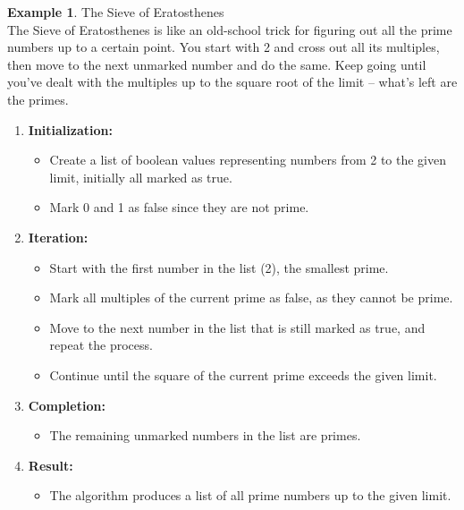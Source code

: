 \documentclass[letterpaper,10pt]{article}
\theoremstyle{plain}
\theoremstyle{definition}
\newtheorem{exmp}[thm]{Example}
\theoremstyle{remark}
\begin{document}
\begin{exmp}{The Sieve of Eratosthenes}$ $\\

The Sieve of Eratosthenes is like an old-school trick for figuring out all the prime numbers up to a certain point. You start with 2 and cross out all its multiples, then move to the next unmarked number and do the same. Keep going until you've dealt with the multiples up to the square root of the limit – what's left are the primes.
\begin{enumerate}
  \item \textbf{Initialization:}
    \begin{itemize}
      \item Create a list of boolean values representing numbers from 2 to the given limit, initially all marked as true.
      \item Mark 0 and 1 as false since they are not prime.
    \end{itemize}
  
  \item \textbf{Iteration:}
    \begin{itemize}
      \item Start with the first number in the list (2), the smallest prime.
      \item Mark all multiples of the current prime as false, as they cannot be prime.
      \item Move to the next number in the list that is still marked as true, and repeat the process.
      \item Continue until the square of the current prime exceeds the given limit.
    \end{itemize}
  
  \item \textbf{Completion:}
    \begin{itemize}
      \item The remaining unmarked numbers in the list are primes.
    \end{itemize}
  
  \item \textbf{Result:}
    \begin{itemize}
      \item The algorithm produces a list of all prime numbers up to the given limit.
    \end{itemize}
\end{enumerate}


\end{exmp}
\end{document}

